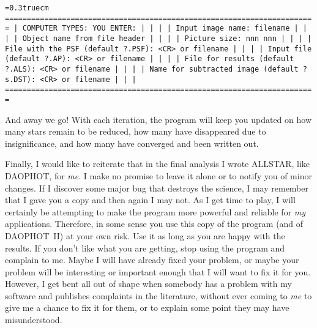 \bigskip
{\noindent\obeylines\obeyspaces\frenchspacing\tt\baselineskip=0.3truecm
=======================================================================
| COMPUTER TYPES:                                  YOU ENTER:         |
|                                                                     |
|                              Input image name:   filename           |
|                                                                     |
|        Object name from file header                                 |
|                                                                     |
|                    Picture size: nnn nnn                            |
|                                                                     |
|             File with the PSF (default ?.PSF):   <CR> or filename   |
|                                                                     |
|                     Input file (default ?.AP):   <CR> or filename   |
|                                                                     |
|              File for results (default ?.ALS):   <CR> or filename   |
|                                                                     |
|    Name for subtracted image (default ?s.DST):   <CR> or filename   |
|                                                                     |
=======================================================================
}
\bigskip

And away we go!  With each iteration, the program will keep you updated
on how many stars remain to be reduced, how many have disappeared due
to insignificance, and how many have converged and been written out.

Finally, I would like to reiterate that in the final analysis I wrote
ALLSTAR, like DAOPHOT, for {\it me\/}.  I make no promise to
leave it alone or to notify you of minor changes.  If I discover some
major bug that destroys the science, I may remember that I gave you a
copy and then again I may not.  As I get time to play, I will certainly
be attempting to make the program more powerful and reliable for {\it
my\/} applications.   Therefore, in some sense you use this copy of the
program (and of DAOPHOT~II) at your own risk.  Use it as long as you
are happy with the results.  If you don't like what you are getting,
stop using the program and complain to me.  Maybe I will have already
fixed your problem, or maybe your problem will be interesting or
important enough that I will want to fix it for you.  However, I get
bent all out of shape when somebody has a problem with my software and
publishes complaints in the literature, without ever coming to {\it
me\/} to give me a chance to fix it for them, or to explain some point
they may have misunderstood.

